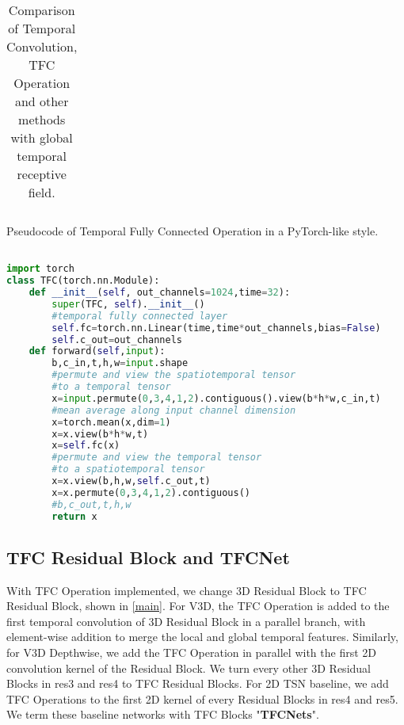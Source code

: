 \documentclass[nohyperref]{article}
\theoremstyle{plain}
\theoremstyle{definition}
\theoremstyle{remark}
\begin{document}
{{\begin{table*}[!htb]
\begin{center}
\begin{tabular}{l|l|l}
\hline
\end{tabular}
\end{center}
\vspace{-5mm}
\caption{Comparison of Temporal Convolution, TFC Operation and other methods with global temporal receptive field.}
\label{cmp_parameter_flops}
\end{table*}

\begin{algorithm}[t]
\caption{Pseudocode of Temporal Fully Connected Operation in a PyTorch-like style.}
\label{alg:TFC}
\begin{lstlisting}[language=python]

import torch
class TFC(torch.nn.Module):
    def __init__(self, out_channels=1024,time=32):
        super(TFC, self).__init__()
        #temporal fully connected layer
        self.fc=torch.nn.Linear(time,time*out_channels,bias=False)
        self.c_out=out_channels
    def forward(self,input):
        b,c_in,t,h,w=input.shape
        #permute and view the spatiotemporal tensor
        #to a temporal tensor       
        x=input.permute(0,3,4,1,2).contiguous().view(b*h*w,c_in,t)
        #mean average along input channel dimension
        x=torch.mean(x,dim=1)
        x=x.view(b*h*w,t)
        x=self.fc(x)
        #permute and view the temporal tensor
        #to a spatiotemporal tensor 
        x=x.view(b,h,w,self.c_out,t)
        x=x.permute(0,3,4,1,2).contiguous() 
        #b,c_out,t,h,w
        return x


\end{lstlisting}
\end{algorithm}



\subsection{TFC Residual Block and TFCNet}
With TFC Operation implemented, we change 3D Residual Block  to TFC Residual Block, shown in \cref{main}. For V3D, the TFC Operation is added to the first temporal convolution of 3D Residual Block in a parallel branch, with element-wise addition to merge the local and global temporal features. Similarly, for V3D Depthwise, we add the TFC Operation in parallel with the first 2D convolution kernel of the Residual Block. We turn every other 3D Residual Blocks in res3 and res4 to TFC Residual Blocks.  For 2D TSN baseline, we  add TFC Operations to the first 2D kernel of every Residual Blocks in res4 and res5. We term these baseline networks with TFC Blocks "{\bf TFCNets}".


}}
\end{document}
